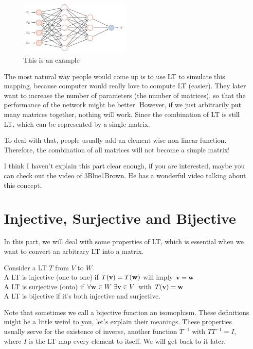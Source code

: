 \begin{figure}[h]
    \centering
    \includegraphics[width=0.5\textwidth]{Chapters/nn.PNG}
    \caption{This is an example}
    \label{fig:example}
\end{figure}

The most natural way people would come up is to use LT to simulate this mapping, because computer would really love to compute LT (easier). They later want to increase the number of parameters (the number of matrices), so that the performance of the network might be better. However, if we just arbitrarily put many matrices together, nothing will work. Since the combination of LT is still LT, which can be represented by a single matrix.

To deal with that, people usually add an element-wise non-linear function. Therefore, the combination of all matrices will not become a simple matrix!

I think I haven't explain this part clear enough, if you are interested, maybe you can check out the video of 3Blue1Brown. He has a wonderful video talking about this concept.  

\section{Injective, Surjective and Bijective}
In this part, we will deal with some properties of LT, which is essential when we want to convert an arbitrary LT into a matrix. 
\begin{definition}
    Consider a LT $T$ from $V$ to $W$.\\
    A LT is injective (one to one) if $T(\mathbf{v}) = T(\mathbf{w})$ will imply $\mathbf{v} = \mathbf{w}$\\
    A LT is surjective (onto) if $\forall \mathbf{w} \in W\ \exists \mathbf{v} \in V$ with $T(\mathbf{v}) = \mathbf{w}$\\
    A LT is bijective if it's both injective and surjective. 
\end{definition}
Note that sometimes we call a bijective function an isomophism. These definitions might be a little weird to you, let's explain their meanings. These properties usually serve for the existence of inverse, another function $T^{-1}$ with $TT^{-1} = I$, where $I$ is the LT map every element to itself. We will get back to it later.\\

